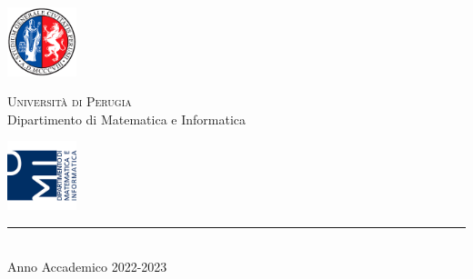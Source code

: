 
\thispagestyle{empty} %

\noindent %
\includegraphics[width=0.15\textwidth]{img/logoUniPg}
\begin{minipage}[b]{0.7\textwidth}
	\centering
	{\Large {\textsc{Universit{\`a} di Perugia}}}\\
	\vspace{0.4 em}
	{\large {Dipartimento di Matematica e Informatica}}
	\vspace{0.6 em}
\end{minipage}%
\includegraphics[width=0.15\textwidth]{img/logoDMI}

\vspace{5 em}

\begin{center}

	{\large {\textsc{\esame}}} %
	\vspace{8 em}

	{\Huge {\titolo}} %
	\vspace{10 em}


	\vspace{6 em}
	\vfill

	{\rule{380pt}{.4pt}}\\
	\vspace{1.2 em}
	\large{{Anno Accademico 2022-2023}} %




\end{center}

